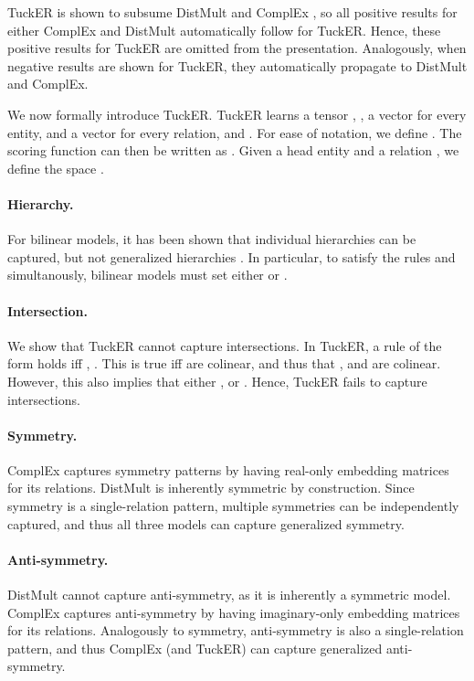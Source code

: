 \documentclass{article}
\begin{document}
TuckER is shown to subsume DistMult and ComplEx \cite{TuckER}, so all positive results for either ComplEx and DistMult automatically follow for TuckER.  Hence, these positive results for TuckER are omitted from the presentation. Analogously, when negative results are shown for TuckER, they automatically propagate to DistMult and ComplEx. 

We now formally introduce TuckER. TuckER learns a tensor ,  , a vector  for every entity, and a vector  for every relation, and . For ease of notation, we define . The scoring function can then be written as . Given a head entity  and a relation , we define the space . 


\paragraph{Hierarchy.} For bilinear models, it has been shown that individual hierarchies can be captured, but not generalized hierarchies \cite{Gutirrez18}. In particular, to satisfy the rules  and  simultanously, bilinear models must set either  or .

\paragraph{Intersection.} We show that TuckER cannot capture intersections. In TuckER, a rule of the form  holds iff , . This is true iff  are colinear, and thus that , and  are colinear. However, this also implies that either , or . Hence, TuckER fails to capture intersections. 

\paragraph{Symmetry.} ComplEx captures symmetry patterns by having real-only embedding matrices for its relations. DistMult is inherently symmetric by construction. Since symmetry is a single-relation pattern, multiple symmetries can be independently captured, and thus all three models can capture generalized symmetry.

\paragraph{Anti-symmetry.} DistMult cannot capture anti-symmetry, as it is inherently a symmetric model. ComplEx captures anti-symmetry by having imaginary-only embedding matrices for its relations. Analogously to symmetry, anti-symmetry is also a single-relation pattern, and thus ComplEx (and TuckER) can capture generalized anti-symmetry.
\end{document}
